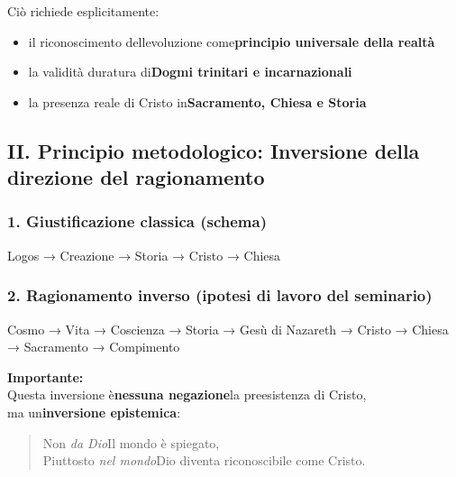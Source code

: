 \documentclass[
]{article}
\begin{document}
Ciò richiede esplicitamente:

\begin{itemize}
\item
  il riconoscimento dell\textquotesingle evoluzione come\textbf{principio universale della realtà}
\item
  la validità duratura di\textbf{Dogmi trinitari e incarnazionali}
\item
  la presenza reale di Cristo in\textbf{Sacramento, Chiesa e Storia}
\end{itemize}

\subsection{\texorpdfstring{\textbf{II. Principio metodologico: Inversione della direzione del ragionamento}}{II. Principio metodologico: Inversione della direzione del ragionamento}}\label{ii.-principio-metodologico-inversione-della-direzione-del-ragionamento}

\subsubsection{\texorpdfstring{\textbf{1. Giustificazione classica (schema)}}{1. Giustificazione classica (schema)}}\label{giustificazione-classica-schema}

Logos → Creazione → Storia → Cristo → Chiesa

\subsubsection{\texorpdfstring{\textbf{2. Ragionamento inverso (ipotesi di lavoro del seminario)}}{2. Ragionamento inverso (ipotesi di lavoro del seminario)}}\label{ragionamento-inverso-ipotesi-di-lavoro-del-seminario}

Cosmo → Vita → Coscienza → Storia → Gesù di Nazareth → Cristo → Chiesa → Sacramento → Compimento

\textbf{Importante:\\
}Questa inversione è\textbf{nessuna negazione}la preesistenza di Cristo,\\
ma un\textbf{inversione epistemica}:

\begin{quote}
Non \emph{da Dio}Il mondo è spiegato,\\
Piuttosto \emph{nel mondo}Dio diventa riconoscibile come Cristo.
\end{quote}
\end{document}
